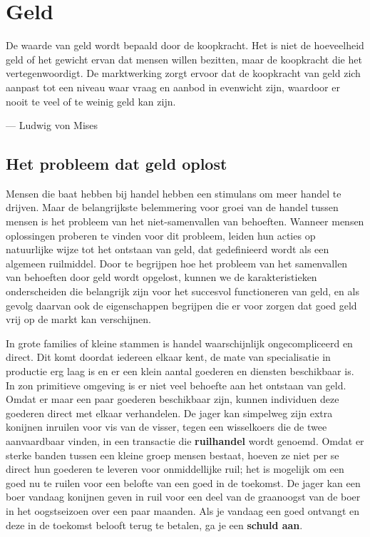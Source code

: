 \hypertarget{geld}{%
\chapter{Geld}\label{geld}}

\begin{blockquotebox}
    De waarde van geld wordt bepaald door de koopkracht. Het is niet de hoeveelheid geld of het gewicht ervan dat mensen willen bezitten, maar de koopkracht die het vertegenwoordigt. De marktwerking zorgt ervoor dat de koopkracht van geld zich aanpast tot een niveau waar vraag en aanbod in evenwicht zijn, waardoor er nooit te veel of te weinig geld kan zijn.\footnotemark
    \par\raggedleft--- Ludwig von Mises
\end{blockquotebox}

\vspace{-2em}
\hypertarget{het-probleem-dat-geld-oplost}{%
\section{Het probleem dat geld oplost}\label{het-probleem-dat-geld-oplost}}

Mensen die baat hebben bij handel hebben een stimulans om meer handel te drijven. Maar de belangrijkste belemmering voor groei van de handel tussen mensen is het probleem van het niet-samenvallen van behoeften. Wanneer mensen oplossingen proberen te vinden voor dit probleem, leiden hun acties op natuurlijke wijze tot het ontstaan van geld, dat gedefinieerd wordt als een algemeen ruilmiddel. Door te begrijpen hoe het probleem van het samenvallen van behoeften door geld wordt opgelost, kunnen we de karakteristieken onderscheiden die belangrijk zijn voor het succesvol functioneren van geld, en als gevolg daarvan ook de eigenschappen begrijpen die er voor zorgen dat goed geld vrij op de markt kan verschijnen.

In grote families of kleine stammen is handel waarschijnlijk ongecompliceerd en direct. Dit komt doordat iedereen elkaar kent, de mate van specialisatie in productie erg laag is en er een klein aantal goederen en diensten beschikbaar is. In zo\textquotesingle n primitieve omgeving is er niet veel behoefte aan het ontstaan van geld. Omdat er maar een paar goederen beschikbaar zijn, kunnen individuen deze goederen direct met elkaar verhandelen. De jager kan simpelweg zijn extra konijnen inruilen voor vis van de visser, tegen een wisselkoers die de twee aanvaardbaar vinden, in een transactie die \textbf{ruilhandel} wordt genoemd. Omdat er sterke banden tussen een kleine groep mensen bestaat, hoeven ze niet per se direct hun goederen te leveren voor onmiddellijke ruil; het is mogelijk om een goed nu te ruilen voor een belofte van een goed in de toekomst. De jager kan een boer vandaag konijnen geven in ruil voor een deel van de graanoogst van de boer in het oogstseizoen over een paar maanden. Als je vandaag een goed ontvangt en deze in de toekomst belooft terug te betalen, ga je een \textbf{schuld aan}.

